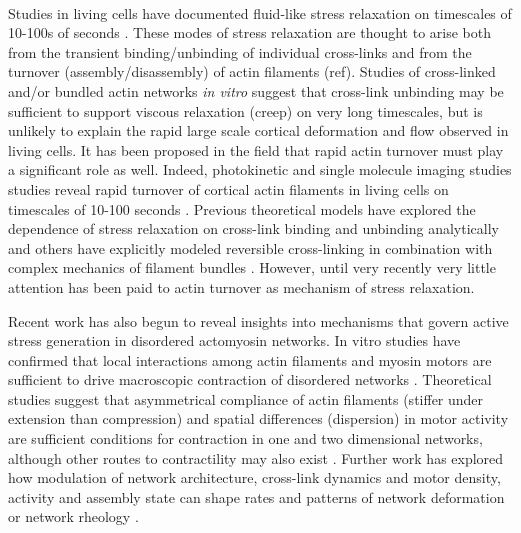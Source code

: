 \documentclass[10pt,letterpaper]{article}
\begin{document}
\paragraph{} Studies in living cells have documented fluid-like stress relaxation on timescales of 10-100s of seconds \cite{cellmech_flows,cellmech_flows2,cellmech_flows3,rheo_fluid,rheo_fluid2,cell_rheo_exp}.  These modes of stress relaxation are thought to arise both from the transient binding/unbinding of individual cross-links and from the turnover (assembly/disassembly) of actin filaments (ref).  Studies of cross-linked and/or bundled actin networks {\em in vitro} suggest that cross-link unbinding may be sufficient to support viscous relaxation (creep) on very long timescales\cite{rheo_crosslinksmatter,rheo_crosslinkslip1,rheo_crosslinkslip2,rheo_crosslinkslip3,rheo_nonaffine}, but is unlikely to explain the rapid large scale cortical deformation and flow observed in living cells.  It has been proposed in the field that rapid actin turnover must play a significant role as well. Indeed, photokinetic and single molecule imaging studies studies reveal rapid turnover of cortical actin filaments in living cells on timescales of 10-100 seconds \cite{Robin:2014aa}. Previous theoretical models have explored  the dependence of stress relaxation on cross-link binding and unbinding analytically \cite{theo_crosslinkslip1,theo_crosslinkslip2} and others have explicitly modeled reversible cross-linking in combination with complex mechanics of filament bundles \cite{model_taeyoon,rheo_crosslinkslip2,theo_crosslinkslip3}.  However, until very recently \cite{Mak:2016aa} very little attention has been paid to actin turnover as mechanism of stress relaxation. 

Recent work has also begun to reveal insights into mechanisms that govern active stress generation in disordered actomyosin networks. In vitro studies have confirmed that local interactions among actin filaments and myosin motors are sufficient to drive macroscopic contraction of disordered networks \cite{rheo_2D1}.  Theoretical studies suggest that asymmetrical compliance of actin filaments (stiffer under extension than compression) and spatial differences (dispersion) in motor activity are sufficient conditions for contraction in one \cite{1367-2630-14-3-033037} and two \cite{PhysRevX.4.041002} dimensional networks, although other routes to contractility may also exist \cite{PhysRevX.4.041002}.  Further work has explored how modulation of network architecture, cross-link dynamics and motor density, activity and assembly state can shape rates and patterns of network deformation \cite{10.1371/journal.pone.0039869,Alvarado:2013aa,C0SM00494D} or network rheology \cite{0295-5075-85-1-18007,rheo_active}.  
\end{document}
